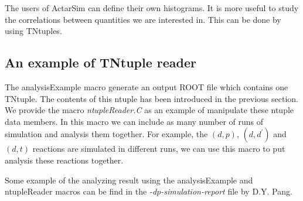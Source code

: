 The users of ActarSim can define their own histograms. It is more useful to study the correlations between quantities we are interested in. This can be done by using TNtuples.

\subsection{An example of TNtuple reader}

The analysisExample macro generate an output ROOT file which contains one TNtuple. The contents of this ntuple has been introduced in the previous section. We provide the macro \textit{ntupleReader.C} as an example of manipulate these ntuple data members. In this macro we can include as many number of runs of simulation and analysis them together. For example, the $(d,p)$, $(d,d^\prime)$ and $(d,t)$ reactions are simulated in different runs, we can use this macro to put analysis these reactions together.

Some example of the analyzing result using the analysisExample and ntupleReader macros can be find in the \textit{-dp-simulation-report} file by D.Y. Pang.
